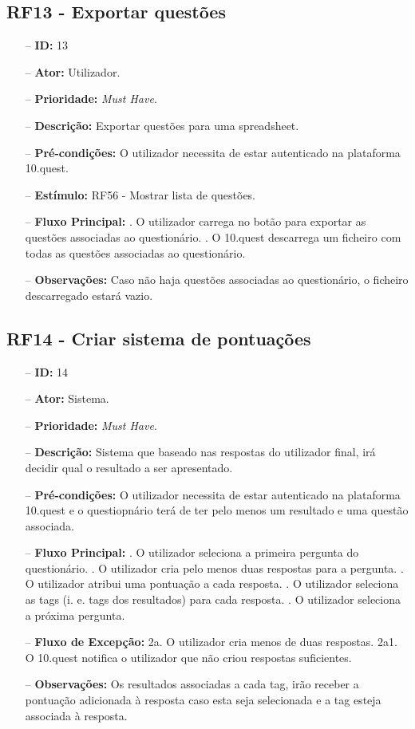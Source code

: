 \subsection{RF13 - Exportar questões}
\begin{itemize}
	\item[--] \textbf{ID:} 13
	\item[--]  \textbf{Ator:} Utilizador.
	\item[--]  \textbf{Prioridade:} \textit{Must Have}.
	\item[--]  \textbf{Descrição:} Exportar questões para uma spreadsheet.
	\item[--]  \textbf{Pré-condições:} O utilizador necessita de estar autenticado na plataforma 10.quest.
	\item[--]  \textbf{Estímulo:}  
		\subitem RF56 - Mostrar lista de questões.
	\item[--]  \textbf{Fluxo Principal:} 
		. O utilizador carrega no botão para exportar as questões associadas ao questionário.
		. O 10.quest descarrega um ficheiro com todas as questões associadas ao questionário.
	\item[--]  \textbf{Observações:} Caso não haja questões associadas ao questionário, o ficheiro descarregado estará vazio.
\end{itemize}
\newpage

\subsection{RF14 - Criar sistema de pontuações}
\begin{itemize}
	\item[--] \textbf{ID:} 14
	\item[--]  \textbf{Ator:} Sistema.
	\item[--]  \textbf{Prioridade:} \textit{Must Have}.
	\item[--]  \textbf{Descrição:} Sistema que baseado nas respostas do utilizador final, irá decidir qual o resultado a ser apresentado.
	\item[--]  \textbf{Pré-condições:}  O utilizador necessita de estar autenticado na plataforma 10.quest e o questiopnário terá de ter pelo menos um resultado e uma questão associada.
	\item[--]  \textbf{Fluxo Principal:} 
		. O utilizador seleciona a primeira pergunta do questionário.
		. O utilizador cria pelo menos duas respostas para a pergunta.
		. O utilizador atribui uma pontuação a cada resposta.
		. O utilizador seleciona as tags (i. e. tags dos resultados) para cada resposta.
		. O utilizador seleciona a próxima pergunta.
	\item[--]  \textbf{Fluxo de Excepção:} 
		\subitem 2a. O utilizador cria menos de duas respostas.
		\subitem 2a1. O 10.quest notifica o utilizador que não criou respostas suficientes.
	\item[--]  \textbf{Observações:} Os resultados associadas a cada tag, irão receber a pontuação adicionada à resposta caso esta seja selecionada e a tag esteja associada à resposta.
\end{itemize}
\newpage

